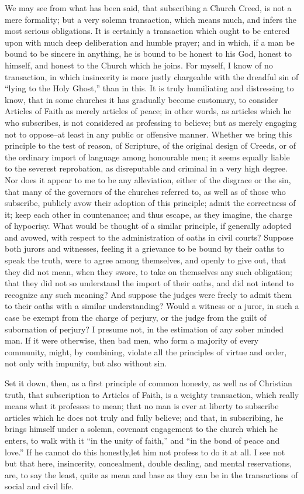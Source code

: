\documentclass[
]{book}
\begin{document}
We may see from what has been said, that subscribing a Church Creed, is not a mere formality; but a very solemn transaction, which means much, and infers the most serious obligations. It is certainly a transaction which ought to be entered upon with much deep deliberation and humble prayer; and in which, if a man be bound to be sincere in anything, he is bound to be honest to his God, honest to himself, and honest to the Church which he joins. For myself, I know of no transaction, in which insincerity is more justly chargeable with the dreadful sin of ``lying to the Holy Ghost,'' than in this. It is truly humiliating and distressing to know, that in some churches it has gradually become customary, to consider Articles of Faith as merely articles of peace; in other words, as articles which he who subscribes, is not considered as professing to believe; but as merely engaging not to oppose--at least in any public or offensive manner. Whether we bring this principle to the test of reason, of Scripture, of the original design of Creeds, or of the ordinary import of language among honourable men; it seems equally liable to the severest reprobation, as disreputable and criminal in a very high degree. Nor does it appear to me to be any alleviation, either of the disgrace or the sin, that many of the governors of the churches referred to, as well as of those who subscribe, publicly avow their adoption of this principle; admit the correctness of it; keep each other in countenance; and thus escape, as they imagine, the charge of hypocrisy. What would be thought of a similar principle, if generally adopted and avowed, with respect to the administration of oaths in civil courts? Suppose both jurors and witnesses, feeling it a grievance to be bound by their oaths to speak the truth, were to agree among themselves, and openly to give out, that they did not mean, when they swore, to take on themselves any such obligation; that they did not so understand the import of their oaths, and did not intend to recognize any such meaning? And suppose the judges were freely to admit them to their oaths with a similar understanding? Would a witness or a juror, in such a case be exempt from the charge of perjury, or the judge from the guilt of subornation of perjury? I presume not, in the estimation of any sober minded man. If it were otherwise, then bad men, who form a majority of every community, might, by combining, violate all the principles of virtue and order, not only with impunity, but also without sin.

Set it down, then, as a first principle of common honesty, as well as of Christian truth, that subscription to Articles of Faith, is a weighty transaction, which really means what it professes to mean; that no man is ever at liberty to subscribe articles which he does not truly and fully believe; and that, in subscribing, he brings himself under a solemn, covenant engagement to the church which he enters, to walk with it ``in the unity of faith,'' and ``in the bond of peace and love.'' If he cannot do this honestly,let him not profess to do it at all. I see not but that here, insincerity, concealment, double dealing, and mental reservations, are, to say the least, quite as mean and base as they can be in the transactions of social and civil life.
\end{document}
